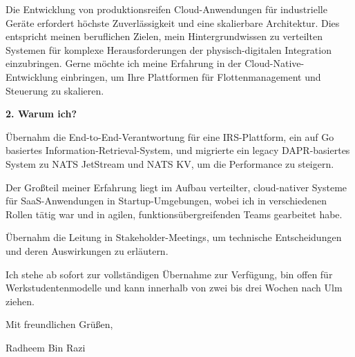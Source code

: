 \documentclass[11pt,a4paper]{coverletter}
\begin{document}
Die Entwicklung von produktionsreifen Cloud-Anwendungen für industrielle Geräte erfordert höchste Zuverlässigkeit und eine skalierbare Architektur. Dies entspricht meinen beruflichen Zielen, mein Hintergrundwissen zu verteilten Systemen für komplexe Herausforderungen der physisch-digitalen Integration einzubringen. Gerne möchte ich meine Erfahrung in der Cloud-Native-Entwicklung einbringen, um Ihre Plattformen für Flottenmanagement und Steuerung zu skalieren.

\vspace{8pt}\noindent\textbf{2. Warum ich?}\par\vspace{3pt}

\bullets

  \item Übernahm die End-to-End-Verantwortung für eine IRS-Plattform, ein auf Go basiertes Information-Retrieval-System, und migrierte ein legacy DAPR-basiertes System zu NATS JetStream und NATS KV, um die Performance zu steigern.

  \item Der Großteil meiner Erfahrung liegt im Aufbau verteilter, cloud-nativer Systeme für SaaS-Anwendungen in Startup-Umgebungen, wobei ich in verschiedenen Rollen tätig war und in agilen, funktionsübergreifenden Teams gearbeitet habe.

  \item Übernahm die Leitung in Stakeholder-Meetings, um technische Entscheidungen und deren Auswirkungen zu erläutern.

\bulletsend

Ich stehe ab sofort zur vollständigen Übernahme zur Verfügung, bin offen für Werkstudentenmodelle und kann innerhalb von zwei bis drei Wochen nach Ulm ziehen.

\closing{Mit freundlichen Grüßen,}{Radheem Bin Razi}
\end{document}
